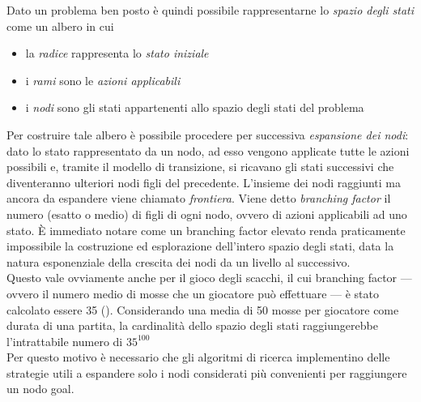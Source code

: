 Dato un problema ben posto è quindi possibile rappresentarne lo \emph{spazio degli stati} come un albero in cui
\begin{itemize}
   \item la \emph{radice} rappresenta lo \emph{stato iniziale}
   \item i \emph{rami} sono le \emph{azioni applicabili}
   \item i \emph{nodi} sono gli stati appartenenti allo spazio degli stati del problema
\end{itemize} 
Per costruire tale albero è possibile procedere per successiva \emph{espansione dei nodi}: dato lo stato rappresentato da un nodo, ad esso vengono applicate tutte le azioni possibili e, tramite il modello di transizione, si ricavano gli stati successivi che diventeranno ulteriori nodi figli del precedente.
L'insieme dei nodi raggiunti ma ancora da espandere viene chiamato \emph{frontiera}.
Viene detto \emph{branching factor} il numero (esatto o medio) di figli di ogni nodo, ovvero di azioni applicabili ad uno stato.
È immediato notare come un branching factor elevato renda praticamente impossibile la costruzione ed esplorazione dell'intero spazio degli stati, data la natura esponenziale della crescita dei nodi da un livello al successivo.\\
Questo vale ovviamente anche per il gioco degli scacchi, il cui branching factor --- ovvero il numero medio di mosse che un giocatore può effettuare --- è stato calcolato essere 35 (\cite{chessbf}).
Considerando una media di 50 mosse per giocatore come durata di una partita, la cardinalità dello spazio degli stati raggiungerebbe l'intrattabile numero di $ 35^{100} $ \\
Per questo motivo è necessario che gli algoritmi di ricerca implementino delle strategie utili a espandere solo i nodi considerati più convenienti per raggiungere un nodo goal.

